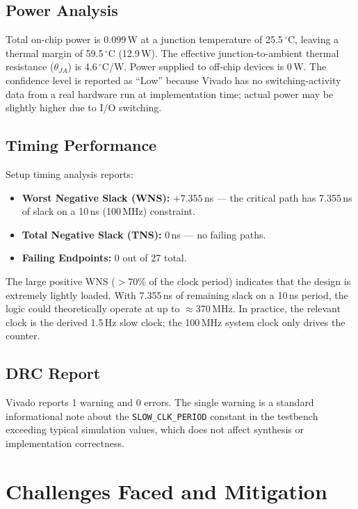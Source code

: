 \documentclass[12pt,a4paper]{report}
\begin{document}
\section{Power Analysis}

Total on-chip power is 0.099\,W at a junction temperature of 25.5\,$^\circ$C, leaving a thermal margin of 59.5\,$^\circ$C (12.9\,W). The effective junction-to-ambient thermal resistance ($\theta_{JA}$) is 4.6\,$^\circ$C/W. Power supplied to off-chip devices is 0\,W. The confidence level is reported as ``Low'' because Vivado has no switching-activity data from a real hardware run at implementation time; actual power may be slightly higher due to I/O switching.

\section{Timing Performance}

Setup timing analysis reports:
\begin{itemize}[leftmargin=1.5em]
  \item \textbf{Worst Negative Slack (WNS):} $+7.355$\,ns --- the critical path has 7.355\,ns of slack on a 10\,ns (100\,MHz) constraint.
  \item \textbf{Total Negative Slack (TNS):} 0\,ns --- no failing paths.
  \item \textbf{Failing Endpoints:} 0 out of 27 total.
\end{itemize}

The large positive WNS ($>$70\% of the clock period) indicates that the design is extremely lightly loaded. With 7.355\,ns of remaining slack on a 10\,ns period, the logic could theoretically operate at up to $\approx$370\,MHz. In practice, the relevant clock is the derived 1.5\,Hz slow clock; the 100\,MHz system clock only drives the counter.

\section{DRC Report}

Vivado reports 1 warning and 0 errors. The single warning is a standard informational note about the \texttt{SLOW\_CLK\_PERIOD} constant in the testbench exceeding typical simulation values, which does not affect synthesis or implementation correctness.

\chapter{Challenges Faced and Mitigation}
\end{document}
